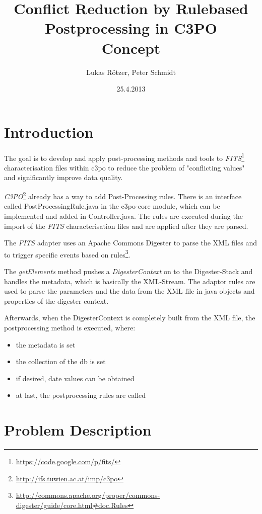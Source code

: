 \documentclass[a4paper,12pt]{article}
\title{Conflict Reduction by Rulebased Postprocessing in C3PO\\ \medskip Concept}
\author{Lukas Rötzer, Peter Schmidt}
\date{25.4.2013}
\begin{document}
\maketitle
\thispagestyle{empty}

\clearpage

\section{Introduction}

The goal is to develop and apply post-processing methods and tools to \emph{FITS}\footnote{\url{https://code.google.com/p/fits/}} characterisation files within c3po to reduce the problem of "conflicting values" and significantly improve data quality. 

\emph{C3PO}\footnote{\url{http://ifs.tuwien.ac.at/imp/c3po}} already has a way to add Post-Processing rules. There is an interface called PostProcessingRule.java in the c3po-core module, which can be implemented and added in Controller.java. The rules are executed during the import of the \emph{FITS} characterisation files and are applied after they are parsed.

The \emph{FITS} adapter uses an Apache Commons Digester to parse the XML files and to trigger specific events based on rules\footnote{\url{http://commons.apache.org/proper/commons-digester/guide/core.html\#doc.Rules}}.

The \emph{getElements} method pushes a \emph{DigesterContext} on to the Digester-Stack and handles the metadata, which is basically the XML-Stream.
The adaptor rules are used to parse the parameters and the data from the XML file in java objects and properties of the digester context.

Afterwards, when the DigesterContext is completely built from the XML file, the postprocessing method is executed, where:
\begin{itemize}
\item the metadata is set
\item the collection of the db is set
\item if desired, date values can be obtained
\item at last, the postprocessing rules are called
\end{itemize}

\section{Problem Description}
\end{document}
